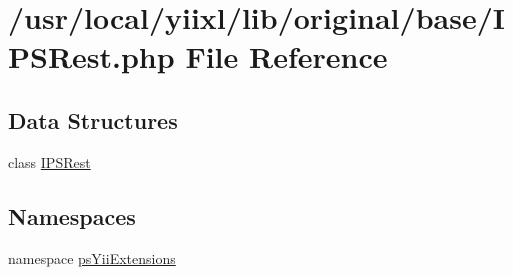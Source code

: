 \hypertarget{IPSRest_8php}{
\section{/usr/local/yiixl/lib/original/base/IPSRest.php File Reference}
\label{IPSRest_8php}
}
\subsection*{Data Structures}
\begin{DoxyCompactItemize}
\item 
class \hyperlink{classIPSRest}{IPSRest}
\end{DoxyCompactItemize}
\subsection*{Namespaces}
\begin{DoxyCompactItemize}
\item 
namespace \hyperlink{namespacepsYiiExtensions}{psYiiExtensions}
\end{DoxyCompactItemize}
